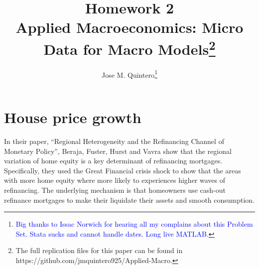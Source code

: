 \documentclass[11pt]{article}
\title{Homework 2 \\ \small{Applied Macroeconomics: Micro Data for Macro Models}\thanks{The full replication files for this paper can be found in https://github.com/jmquintero925/Applied-Macro.}}
\author{Jose M. Quintero\thanks{\textcolor{blue}{Big thanks to Issac Norwich for hearing all my complains about this Problem Set. Stata sucks and cannot handle dates. Long live MATLAB.} }}
\date{}
\begin{document}
\vspace{-1cm}\maketitle\vspace{-1cm}

\section{House price growth}
In their paper, ``Regional Heterogeneity and the Refinancing Channel of Monetary Policy”, Beraja, Fuster, Hurst and Vavra show that the regional variation of home equity is a key determinant of refinancing mortgages. Specifically, they used the Great Financial crisis shock to show that the areas with more home equity where more likely to experiences higher waves of refinancing. The underlying mechanism is that homeowners use cash-out refinance mortgages to make their  liquidate their assets and smooth consumption. 
\end{document}
